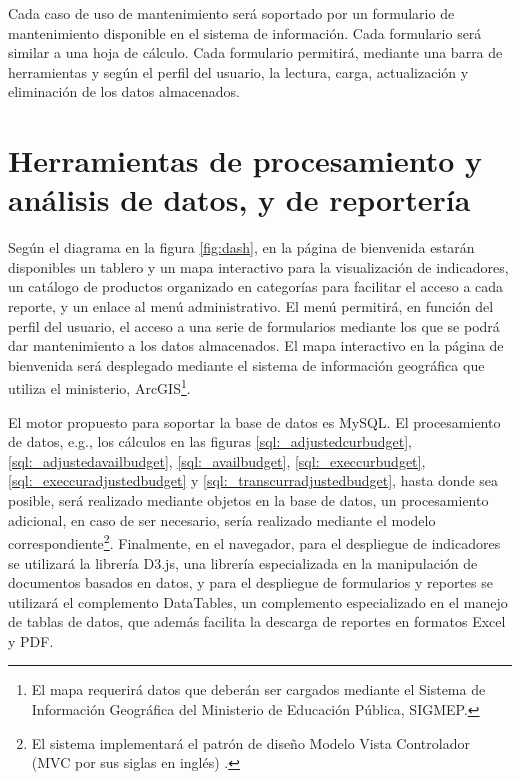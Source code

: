 \documentclass{article}
\begin{document}
\begin{multicols}{6}[]
Cada caso de uso de mantenimiento ser\'a soportado por un formulario de mantenimiento disponible en el sistema de informaci\'on. Cada formulario ser\'a similar a una hoja de c\'alculo. Cada formulario permitir\'a, mediante una barra de herramientas y seg\'un el perfil del usuario, la lectura, carga, actualizaci\'on y eliminaci\'on de los datos almacenados.

\section{Herramientas de procesamiento y an\'alisis de datos, y de reporter\'ia} \label{sec:tools}


Seg\'un el diagrama en la figura \ref{fig:dash}, en la p\'agina de bienvenida estar\'an disponibles un tablero y un mapa interactivo para la visualizaci\'on de indicadores, un cat\'alogo de productos organizado en categor\'ias para facilitar el acceso a cada reporte, y un enlace al men\'u administrativo. El men\'u permitir\'a, en funci\'on del perfil del usuario, el acceso a una serie de formularios mediante los que se podr\'a dar mantenimiento a los datos almacenados. El mapa interactivo en la p\'agina de bienvenida ser\'a desplegado mediante el sistema de informaci\'on geogr\'afica que utiliza el ministerio, ArcGIS\footnote{El mapa requerir\'a datos que deber\'an ser cargados mediante el Sistema de Informaci\'on Geogr\'afica del Ministerio de Educaci\'on P\'ublica, SIGMEP.}.

El motor propuesto para soportar la base de datos es MySQL. El procesamiento de datos, e.g., los c\'alculos en las figuras \ref{sql:_adjustedcurbudget}, \ref{sql:_adjustedavailbudget}, \ref{sql:_availbudget}, \ref{sql:_execcurbudget}, \ref{sql:_execcuradjustedbudget} y \ref{sql:_transcurradjustedbudget}, hasta donde sea posible, ser\'a realizado mediante objetos en la base de datos, un procesamiento adicional, en caso de ser necesario, ser\'ia realizado mediante el modelo correspondiente\footnote{El sistema implementar\'a el patr\'on de dise\~no Modelo Vista Controlador (MVC por sus siglas en ingl\'es) \cite{prop}.}. Finalmente, en el navegador, para el despliegue de indicadores se utilizar\'a la librer\'ia D3.js, una librer\'ia especializada en la manipulaci\'on de documentos basados en datos, y para el despliegue de formularios y reportes se utilizar\'a el complemento DataTables, un complemento especializado en el manejo de tablas de datos, que adem\'as facilita la descarga de reportes en formatos Excel y PDF.


\end{multicols}
\end{document}
